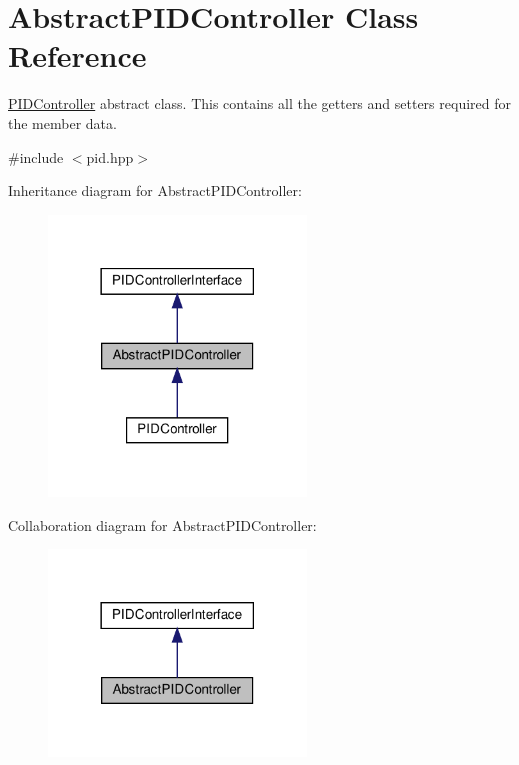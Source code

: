 \hypertarget{classAbstractPIDController}{}\section{Abstract\+P\+I\+D\+Controller Class Reference}
\label{classAbstractPIDController}


\hyperlink{classPIDController}{P\+I\+D\+Controller} abstract class. This contains all the getters and setters required for the member data.  




{\ttfamily \#include $<$pid.\+hpp$>$}



Inheritance diagram for Abstract\+P\+I\+D\+Controller\+:\nopagebreak
\begin{figure}[H]
\begin{center}
\leavevmode
\includegraphics[width=194pt]{classAbstractPIDController__inherit__graph}
\end{center}
\end{figure}


Collaboration diagram for Abstract\+P\+I\+D\+Controller\+:\nopagebreak
\begin{figure}[H]
\begin{center}
\leavevmode
\includegraphics[width=194pt]{classAbstractPIDController__coll__graph}
\end{center}
\end{figure}
